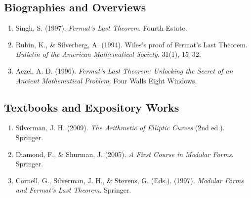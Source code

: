 \subsection*{Biographies and Overviews}
\begin{enumerate}
    \item Singh, S. (1997). \textit{Fermat's Last Theorem}. Fourth Estate.
    \item Rubin, K., \& Silverberg, A. (1994). Wiles's proof of Fermat's Last Theorem. \textit{Bulletin of the American Mathematical Society}, 31(1), 15--32.
    \item Aczel, A. D. (1996). \textit{Fermat's Last Theorem: Unlocking the Secret of an Ancient Mathematical Problem}. Four Walls Eight Windows.
\end{enumerate}

\subsection*{Textbooks and Expository Works}
\begin{enumerate}
    \item Silverman, J. H. (2009). \textit{The Arithmetic of Elliptic Curves} (2nd ed.). Springer.
    \item Diamond, F., \& Shurman, J. (2005). \textit{A First Course in Modular Forms}. Springer.
    \item Cornell, G., Silverman, J. H., \& Stevens, G. (Eds.). (1997). \textit{Modular Forms and Fermat's Last Theorem}. Springer.
\end{enumerate}
